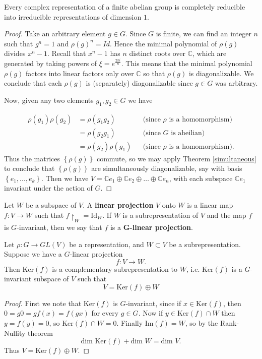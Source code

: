 \begin{thm} Every complex representation of a finite abelian group is completely reducible into irreducible representations of dimension $1$.  
\end {thm}
\begin{proof}
Take an arbitrary element $g \in G$.  Since $G$ is finite, we can find an integer $n$ such that $g^n = 1$ and $\rho(g)^n = Id$.    Hence the minimal polynomial of $\rho(g)$ divides  $x^n -1$.  Recall that $x^n-1$ has $n$ distinct roots over $\mathbb{C}$, which are generated by taking powers of $\xi = e^{\frac{2 \pi i}{n}}$.  This means that the minimal polynomial $\rho(g)$ factors into linear factors only over $\mathbb{C}$ so that $\rho(g)$ is diagonalizable.  We conclude that each $\rho(g)$ is (separately) diagonalizable since $g \in G$ was arbitrary.

Now, given any two elements $g_1, g_2 \in G$ we have 

\begin{align*}
\rho(g_1) \rho(g_2)&= \rho(g_1 g_2)&& \text{(since $\rho$ is a homomorphism)} \\
		&=  \rho(g_2 g_1) && \text{(since $G$ is abeilian)} \\
		&= \rho(g_2) \rho(g_1) && \text{(since $\rho$ is a homomorphism)}.
\end{align*}
Thus the matrices $\left\{ \rho(g)\right\}$ commute, so we may apply Theorem \ref{simultaneous} to conclude that $\left\{ \rho(g)\right\}$ are simultaneously diagonalizable, say with basis $\left\{ e_1, ..., e_k \right\}$.  Then we have $V= \mathbb{C}e_1 \oplus \mathbb{C} e_2 \oplus \ldots \oplus \mathbb{C} e_n$, with each subspace $ \mathbb{C}e_1$ invariant under the action of $G$.
\end{proof}

\begin{defn}
Let $W$ be a subspace of $V$.  A \textbf{linear projection} $V$ onto $W$ is a linear map $f \colon V \to W$ such that $f \restriction_{W} = \text{Id}_W$.  If $W$ is a subrepresentation of $V$ and the map $f$ is $G$-invariant, then we say that $f$ is a $\mathbf{G}$\textbf{-linear projection}.
\end{defn}

\begin{lemma} \label{maschke-lemma}
Let $\rho \colon G \to GL(V)$ be a representation, and $W \subset V$ be a subrepresentation.  Suppose we have a $G$-linear projection 
\[ f \colon V \to W. \]
Then $\text{Ker}(f)$ is a complementary subrepresentation to $W$, i.e. $\text{Ker}(f)$ is a $G$-invariant subspace of $V$ such that
\[ V = \text{Ker}(f) \oplus W \]
\end{lemma}
\begin{proof}
First we note that $\text{Ker}(f)$ is $G$-invariant, since if $x \in \text{Ker}(f)$, then $0 = g0 = g f(x) = f(gx)$ for every $g \in G$.
Now if $y \in \text{Ker}(f) \cap W$ then $y=f(y)=0$, so $\text{Ker}(f) \cap W = 0$.  Finally $\text{Im}(f)=W$, so by the Rank-Nullity theorem
\[ \text{dim Ker}(f) + \text{dim }W = \text{dim }V. \]
Thus $V = \text{Ker}(f) \oplus W$.  
\end{proof}

